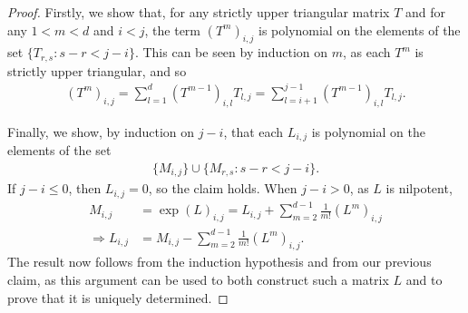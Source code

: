\begin{proof}
Firstly, we show that, for any strictly upper triangular matrix $T$ and for any $1<m<d$ and $i<j$, the term ${(T^{m})}_{i,j}$ is polynomial on the elements of the set $\lbrace T_{r,s} : s-r<j-i \rbrace$. This can be seen by induction on $m$, as each $T^{m}$ is strictly upper triangular, and so
\begin{align*}
{(T^{m})}_{i,j} = \sum\limits_{l=1}^{d} {(T^{m-1})}_{i,l} T_{l,j} = \sum\limits_{l=i+1}^{j-1} {(T^{m-1})}_{i,l} T_{l,j} .
\end{align*}

Finally, we show, by induction on $j-i$, that each $L_{i,j}$ is polynomial on the elements of the set
\begin{align*}
\lbrace M_{i,j} \rbrace \cup \lbrace M_{r,s} : s-r < j-i \rbrace .
\end{align*}
If $j-i \leq 0$, then $L_{i,j}=0$, so the claim holds. When $j-i>0$, as $L$ is nilpotent,
\begin{align*}
M_{i,j} &= \exp{(L)}_{i,j} = L_{i,j} + \sum\limits_{m=2}^{d-1} \frac{1}{m!} {(L^{m})}_{i,j} \\ \Rightarrow L_{i,j} &= M_{i,j} - \sum\limits_{m=2}^{d-1} \frac{1}{m!} {(L^{m})}_{i,j} .
\end{align*}
The result now follows from the induction hypothesis and from our previous claim, as this argument can be used to both construct such a matrix $L$ and to prove that it is uniquely determined.
\end{proof}
